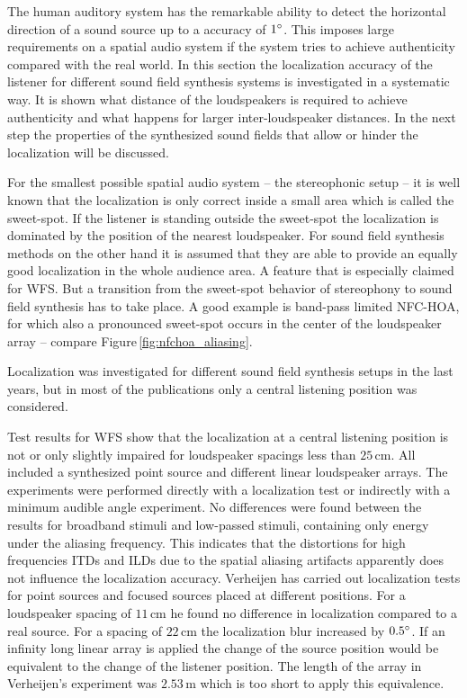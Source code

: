 The human auditory system has the remarkable ability to detect the horizontal
direction of a sound source up to a accuracy of $1^\circ$. This imposes large
requirements on a spatial audio system if the system tries to achieve
authenticity
compared with the real world. In this section the localization accuracy of the
listener for different sound field synthesis systems is investigated in a
systematic way. It is shown what distance of the loudspeakers is required to
achieve authenticity and what happens for larger inter-loudspeaker
distances. In the next step the properties of the
synthesized sound fields that allow or hinder the localization will be discussed.

For the smallest possible spatial audio system -- the stereophonic setup -- it is
well known that the localization is only correct inside a small area which is
called the sweet-spot. If the listener is standing outside the sweet-spot the
localization is dominated by the position of the nearest loudspeaker.
For sound field synthesis methods on the other hand it is assumed that they are
able to provide an equally good localization in the whole audience area. A
feature that is especially claimed for \ac{WFS}.
But a transition from the sweet-spot behavior of stereophony to
sound field synthesis has to take place. A good
example is band-pass limited \ac{NFC-HOA}, for which also a pronounced sweet-spot
occurs in the center of the loudspeaker array -- compare
Figure\,\ref{fig:nfchoa_aliasing}.

Localization was investigated for different sound field synthesis setups in the
last years, but in most of the publications only a central
listening position was considered.

Test results for \ac{WFS} show that the
localization
at a central listening position is not or only slightly impaired
for loudspeaker spacings less than
$25$\,cm.\autocite{Vogel1993,Start1997,Wittek2007}
All included a synthesized point source and different linear
loudspeaker arrays.
The experiments were performed directly with a localization test or indirectly with a
minimum audible angle experiment\autocite{Vogel1993}. No differences were found
between the results for
broadband stimuli and low-passed stimuli, containing only energy under the
aliasing frequency. This indicates that the distortions for high
frequencies \acp{ITD} and \acp{ILD} due to the spatial aliasing artifacts
apparently does not influence the localization accuracy.
Verheijen has carried out localization tests for point sources and focused sources
placed at different positions.\autocite{Verheijen1997}
For a loudspeaker spacing of $11$\,cm he found no difference in localization 
compared to a real source. For a spacing of $22$\,cm the localization blur
increased by $0.5^\circ$.
If an infinity long linear array is applied the
change of the source position would be equivalent to the change of the listener
position. The length of the array in Verheijen's experiment was $2.53$\,m which
is too short to apply this equivalence.

